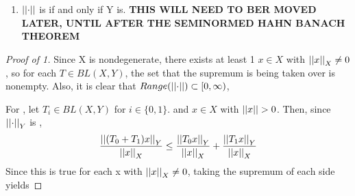 \begin{prop}
\begin{enumerate}
\item $\left|\left| \cdot \right|\right|$ is \NonDegenerate if and only if Y is. \bf THIS WILL NEED TO BER MOVED LATER, UNTIL AFTER THE SEMINORMED HAHN BANACH THEOREM \rm
\end{enumerate}


\begin{proof}[Proof of 1] 
    Since X is nondegenerate, there exists at least 1 $x \in X$ with $\left|\left| x \right|\right|_X \neq 0$, 
    so for each $T \in BL(X,Y)$, the set that the supremum is being taken over is nonempty.
    Also, it is clear that $Range(\left|\left| \cdot \right|\right|) \subset [0,\infty)$, 

    For \Subadditivity, let $T_i \in BL(X,Y)$ for $i \in \{0,1\}$. and $x \in X$ with $\left|\left| x \right|\right| > 0$.
    Then, since $\left|\left| \cdot \right|\right|_Y$ is \Subadditive, 
    \begin{align*}
    \frac{\left|\left| (T_0+T_1)x \right|\right|_Y}{\left|\left| x \right|\right|_X} \leq \frac{\left|\left| T_0x \right|\right|_Y}{\left|\left| x \right|\right|_X}+ \frac{\left|\left| T_1x \right|\right|_Y}{\left|\left| x \right|\right|_X}
    \end{align*}
    Since this is true for each x with $\left|\left| x \right|\right|_X \neq 0$, taking the supremum of each side yields


\end{proof}
\end{prop}
